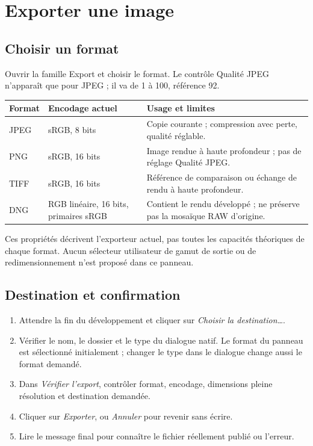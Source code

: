 \chapter{Exporter une image}
\label{chap:export}
\section{Choisir un format}
Ouvrir la famille Export et choisir le format. Le contrôle Qualité JPEG
n’apparaît que pour JPEG ; il va de 1 à 100, référence 92.
\begin{longtable}{@{}L{2cm}L{4.6cm}L{7cm}@{}}
\toprule Format & Encodage actuel & Usage et limites\\\midrule\endhead
JPEG & sRGB, 8 bits & Copie courante ; compression avec perte, qualité réglable.\\
PNG & sRGB, 16 bits & Image rendue à haute profondeur ; pas de réglage Qualité JPEG.\\
TIFF & sRGB, 16 bits & Référence de comparaison ou échange de rendu à haute profondeur.\\
DNG & RGB linéaire, 16 bits, primaires sRGB & Contient le rendu développé ; ne préserve pas la mosaïque RAW d’origine.\\
\bottomrule
\end{longtable}
Ces propriétés décrivent l’exporteur actuel, pas toutes les capacités théoriques
de chaque format. Aucun sélecteur utilisateur de gamut de sortie ou de redimensionnement
n’est proposé dans ce panneau.

\section{Destination et confirmation}
\begin{enumerate}
\item Attendre la fin du développement et cliquer sur \emph{Choisir la destination…}.
\item Vérifier le nom, le dossier et le type du dialogue natif. Le format du
panneau est sélectionné initialement ; changer le type dans le dialogue change
aussi le format demandé.
\item Dans \emph{Vérifier l’export}, contrôler format, encodage, dimensions
pleine résolution et destination demandée.
\item Cliquer sur \emph{Exporter}, ou \emph{Annuler} pour revenir sans écrire.
\item Lire le message final pour connaître le fichier réellement publié ou l’erreur.
\end{enumerate}
